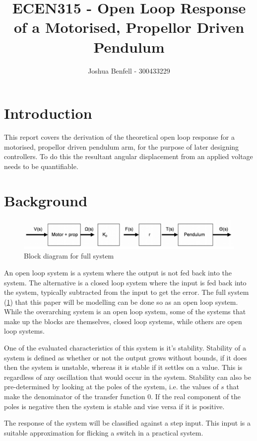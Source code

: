 \documentclass[a4paper, 12pt, compsoc]{IEEEtran}
\title{ECEN315 - Open Loop Response of a Motorised, Propellor Driven Pendulum}
\author{Joshua Benfell - 300433229}
\begin{document}
    \maketitle
    \IEEEdisplaynontitleabstractindextext

    \section{Introduction}\label{sec:intro}
        This report covers the derivation of the theoretical open loop response for a motorised, propellor driven pendulum arm, for the purpose of later designing controllers. To do this the resultant angular displacement from an applied voltage needs to be quantifiable.

    \section{Background}\label{sec:bg}
        \begin{figure}[!h]
            \centering
            \includegraphics[width=\columnwidth]{overallBlockDiagram.png}
            \caption{Block diagram for full system}
            \label{fig:fullBlockDiagram}
        \end{figure}
        An open loop system is a system where the output is not fed back into the system. The alternative is a closed loop system where the input is fed back into the system, typically subtracted from the input to get the error. The full system (\cref{fig:fullBlockDiagram}) that this paper will be modelling can be done so as an open loop system. While the overarching system is an open loop system, some of the systems that make up the blocks are themselves, closed loop systems, while others are open loop systems.
        \par
        One of the evaluated characteristics of this system is it's stability. Stability of a system is defined as whether or not the output grows without bounds, if it does then the system is unstable, whereas it is stable if it settles on a value. This is regardless of any oscillation that would occur in the system. Stability can also be pre-determined by looking at the poles of the system, i.e. the values of $s$ that make the denominator of the transfer function $0$. If the real component of the poles is negative then the system is stable and vise versa if it is positive.
        \par
        The response of the system will be classified against a step input. This input is a suitable approximation for flicking a switch in a practical system.
\end{document}
